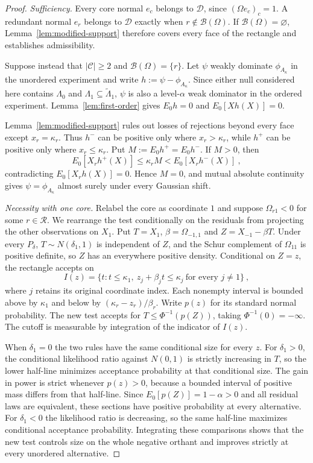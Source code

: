 \documentclass[11pt]{article}
\newcommand{\red}[1]{{\color{red}#1}} %
\numberwithin{equation}{section}
\theoremstyle{definition}
\begin{document}
{\begin{proof}
\red{\emph{Sufficiency.} }Every core normal $e_c$ belongs to $\mathcal D$, since $(\Omega e_c)_c=1$. A redundant normal $e_r$ belongs to $\mathcal D$ exactly when $r\notin\mathcal B(\Omega)$. If $\mathcal B(\Omega)=\varnothing$, Lemma~\ref{lem:modified-support} therefore covers every face of the rectangle and establishes admissibility.

Suppose instead that $|\mathcal C|\ge2$ and $\mathcal B(\Omega)=\{r\}$. Let $\psi$ weakly dominate $\phi_{A_\kappa}$ in the \red{unordered} experiment and write $h:=\psi-\phi_{A_\kappa}$. Since either null considered here contains $\Lambda_0$ and $\Lambda_1\subseteq\widetilde\Lambda_1$, $\psi$ is also a level-$\alpha$ weak dominator in the \red{ordered} experiment. Lemma~\ref{lem:first-order} gives $E_0h=0$ and $E_0[Xh(X)]=0$.

Lemma~\ref{lem:modified-support} rules out losses of rejections beyond every face except $x_r=\kappa_r$. Thus $h^-$ can be positive only where $x_r>\kappa_r$, while $h^+$ can be positive only where $x_r\le\kappa_r$. Put $M:=E_0h^+=E_0h^-$. If $M>0$, then
\[
E_0[X_rh^+(X)]\le\kappa_r M
<E_0[X_rh^-(X)]~,
\]
contradicting $E_0[X_rh(X)]=0$. Hence $M=0$, and mutual absolute continuity gives $\psi=\phi_{A_\kappa}$ almost surely under every Gaussian shift.

\red{\emph{Necessity with one core.}
Relabel the core as coordinate $1$ and suppose $\Omega_{r1}<0$ for some $r\in\mathcal R$. We rearrange the test conditionally on the residuals from projecting the other observations on $X_1$. Put $T=X_1$, $\beta=\Omega_{-1,1}$ and $Z=X_{-1}-\beta T$. Under every $P_\delta$, $T\sim N(\delta_1,1)$ is independent of $Z$, and the Schur complement of $\Omega_{11}$ is positive definite, so $Z$ has an everywhere positive density. Conditional on $Z=z$, the rectangle accepts on
\[
 I(z)=\{t:t\le\kappa_1,\ z_j+\beta_j t\le\kappa_j\ \text{for every }j\ne1\}~,
\]
where $j$ retains its original coordinate index. Each nonempty interval is bounded above by $\kappa_1$ and below by $(\kappa_r-z_r)/\beta_r$. Write $p(z)$ for its standard normal probability. The new test accepts for $T\le\Phi^{-1}(p(Z))$, taking $\Phi^{-1}(0)=-\infty$. The cutoff is measurable by integration of the indicator of $I(z)$.

When $\delta_1=0$ the two rules have the same conditional size for every $z$. For $\delta_1>0$, the conditional likelihood ratio against $N(0,1)$ is strictly increasing in $T$, so the lower half-line minimizes acceptance probability at that conditional size. The gain in power is strict whenever $p(z)>0$, because a bounded interval of positive mass differs from that half-line. Since $E_0[p(Z)]=1-\alpha>0$ and all residual laws are equivalent, these sections have positive probability at every alternative. For $\delta_1<0$ the likelihood ratio is decreasing, so the same half-line maximizes conditional acceptance probability. Integrating these comparisons shows that the new test controls size on the whole negative orthant and improves strictly at every unordered alternative.

}
\end{proof}}
\end{document}
